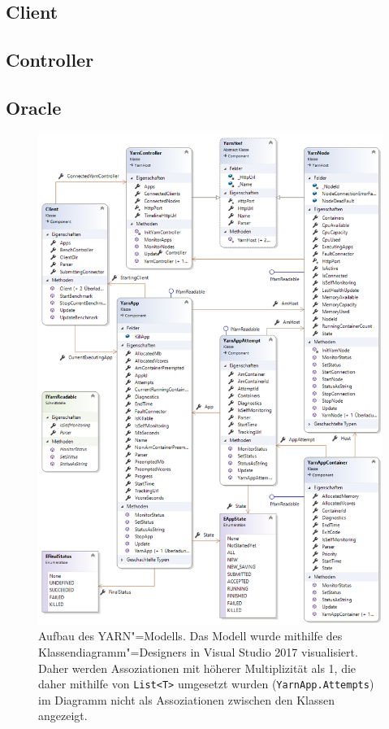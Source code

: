 \subsection{Client}
\label{sec:yarnClient}

\subsection{Controller}
\label{sec:yarnController}

\subsection{Oracle}
\label{sec:oracleImpl}


\begin{figure}
    \includegraphics[width=\columnwidth]{./images/yarnModel.png}
    \caption[Aufbau des YARN"=Modells]
    {Aufbau des YARN"=Modells.
        Das Modell wurde mithilfe des Klassendiagramm"=Designers in Visual Studio 2017 visualisiert.
        Daher werden Assoziationen mit höherer Multiplizität als 1, die daher mithilfe von \texttt{List<T>} umgesetzt wurden (\zB \texttt{YarnApp.Attempts}) im Diagramm nicht als Assoziationen zwischen den Klassen angezeigt.}
    \label{fig:yarnModel}
\end{figure}

